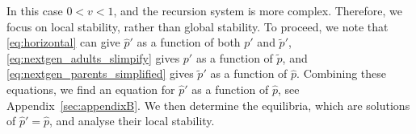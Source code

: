 \documentclass[12pt]{extarticle}
\begin{document}
{In this case $0<v<1$, and the recursion system is more complex.
Therefore, we focus on local stability, rather than global stability.
To proceed, we note that 
\autoref{eq:horizontal} can give $\hat{p}'$ as a function of both $p'$ and $\tilde{p}'$,
\autoref{eq:nextgen_adults_slimpify} gives $p'$ as a function of $\tilde{p}$, and 
\autoref{eq:nextgen_parents_simplified} gives $\tilde{p}'$ as a function of $\hat{p}$. 
Combining these equations, we find an equation for $\hat{p}'$ as a function of $\hat{p}$, see Appendix~\autoref{sec:appendixB}.
We then determine the equilibria, which are solutions of $\hat{p}' = \hat{p}$, and analyse their local stability.

%

}
\end{document}
